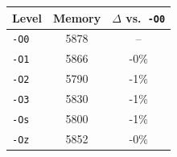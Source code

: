 \begin{tabular*}{\columnwidth}{@{\extracolsep\fill}lcc@{\extracolsep\fill}}
\toprule
\textbf{Level} & \textbf{Memory} & \textbf{$\Delta$ vs.\ \texttt{-O0}} \\
\midrule
\texttt{-O0} & 5878 & -- \\
\texttt{-O1} & 5866 & -0\% \\
\texttt{-O2} & 5790 & -1\% \\
\texttt{-O3} & 5830 & -1\% \\
\texttt{-Os} & 5800 & -1\% \\
\texttt{-Oz} & 5852 & -0\% \\
\bottomrule
\end{tabular*}
